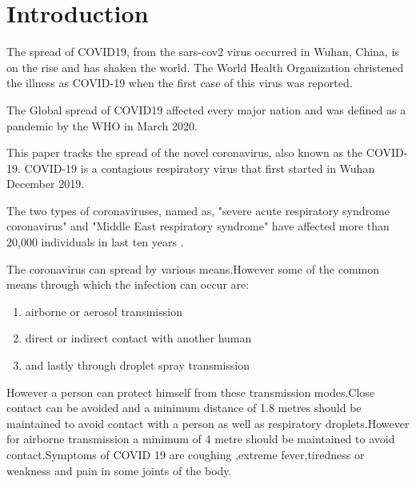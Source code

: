 \section{Introduction}

The spread of COVID19, from the sars-cov2 virus
occurred in Wuhan, China, is on the rise and has shaken the world. The World
Health Organization christened the illness as COVID-19 when the first case of this
virus was reported.

The Global spread of COVID19 affected every major nation and was defined as a
pandemic by the WHO in March 2020.

This paper tracks the spread of the novel coronavirus, also known as the
COVID-19. COVID-19 is a contagious respiratory virus that first started in
Wuhan December 2019. \cite{data_world}

The two types of coronaviruses, named as, "severe acute respiratory syndrome
coronavirus" and "Middle East respiratory syndrome"  have affected more than
20,000 individuals in last ten years \cite{huang2020clinical}.

The coronavirus can spread by various means.However some of the common means through which the infection can occur are:

\begin{enumerate}
	\item airborne or aerosol transmission
	\item direct or indirect contact with another human
	\item and lastly through droplet spray transmission
\end{enumerate}

However a person can protect himself from these transmission modes.Close contact can be avoided and a minimum distance of 1.8 metres should be maintained to avoid contact with a person as well as respiratory droplets.However for airborne transmission a minimum of 4 metre should be maintained to avoid contact.Symptoms of COVID 19 are coughing ,extreme fever,tiredness or weakness and pain in some joints of the body.


